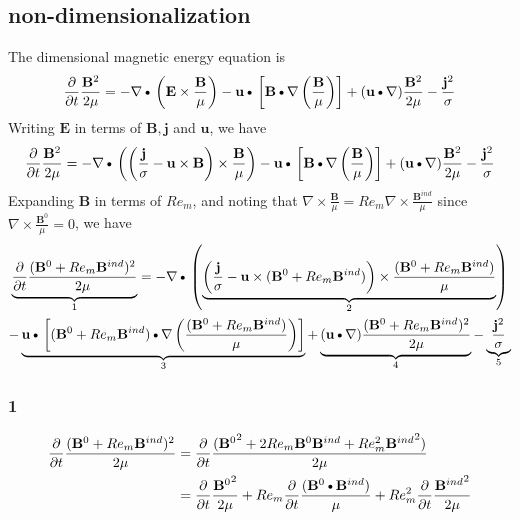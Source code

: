 \documentclass[11pt]{article}
\newcommand{\B}{\mathbf{B}}
\newcommand{\PD}{\partial}
\newcommand{\BM}{\frac{\mathbf{B}}{\mu}}
\newcommand{\J}{\mathbf{j}}
\newcommand{\E}{\mathbf{E}}
\newcommand{\JS}{\frac{\mathbf{j}}{\sigma}}
\newcommand{\JSS}{\frac{\mathbf{j}^2}{\sigma}}
\renewcommand{\U}{\mathbf{u}}
\newcommand{\DOT}{\text{\textbullet}}
\begin{document}
\subsection{non-dimensionalization}
The dimensional magnetic energy equation is
\begin{equation}
	\frac{\PD}{\PD t} \frac{\B^2}{2\mu}
	=
	- \nabla \DOT \left(\E \times \BM \right)
	- \U \DOT \left[\B \DOT \nabla \left( \BM \right) \right]
	+ (\U \DOT \nabla) \frac{\B^2}{2\mu}
	- \JSS
\end{equation}
Writing $\E$ in terms of $\B,\J$ and $\U$, we have
\begin{equation}
	\frac{\PD}{\PD t} \frac{\B^2}{2\mu}
	=
	- \nabla \DOT \left( \left(\JS - \U \times \B \right) \times \BM \right)
	- \U \DOT \left[\B \DOT \nabla \left( \BM \right) \right]
	+ (\U \DOT \nabla) \frac{\B^2}{2\mu}
	- \JSS
\end{equation}
Expanding $\B$ in terms of $Re_m$, and noting that $\nabla \times \frac{\B}{\mu} = Re_m \nabla \times \frac{\B^{ind}}{\mu}$ since $\nabla \times \frac{\B^0}{\mu} = 0$, we have
\begin{multline}
	\underbrace{\frac{\PD}{\PD t} \frac{(\B^0 + Re_m \B^{ind})^2}{2\mu}}_{1}
	=
	- \nabla \DOT \left( \underbrace{ \left(\JS - \U \times (\B^0 + Re_m \B^{ind}) \right) \times \frac{(\B^0 + Re_m \B^{ind})}{\mu} }_{2} \right) \\
	- \underbrace{\U \DOT \left[(\B^0 + Re_m \B^{ind}) \DOT \nabla \left( \frac{(\B^0 + Re_m \B^{ind})}{\mu} \right) \right]}_{3}
	+ \underbrace{(\U \DOT \nabla) \frac{(\B^0 + Re_m \B^{ind})^2}{2\mu}}_{4}
	- \underbrace{\JSS}_{5}
\end{multline}
\subsubsection{1}
\begin{align}
	\frac{\PD}{\PD t} \frac{(\B^0 + Re_m \B^{ind})^2}{2\mu} \notag
	& = \frac{\PD}{\PD t} \frac{({\B^0}^2 + 2 Re_m \B^0 \B^{ind} + Re_m^2 {\B^{ind}}^2)}{2\mu} \notag \\
	& = \frac{\PD}{\PD t} \frac{{\B^0}^2}{2 \mu} + Re_m \frac{\PD}{\PD t} \frac{(\B^0 \DOT \B^{ind})}{\mu} + Re_m^2 \frac{\PD}{\PD t} \frac{{\B^{ind}}^2}{2 \mu} \notag \\
\end{align}
\end{document}
